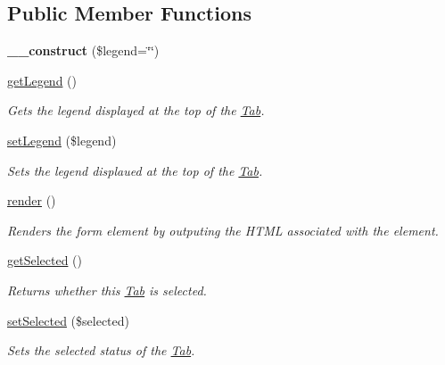 \subsection*{Public Member Functions}
\begin{DoxyCompactItemize}
\item 
\hypertarget{class_tab_a041f3c073a42ad6d5bb9178039b18fb7}{
{\bfseries \_\-\_\-construct} (\$legend=\char`\"{}\char`\"{})}
\label{class_tab_a041f3c073a42ad6d5bb9178039b18fb7}

\item 
\hypertarget{class_tab_a177b514a74756b45c634e3e8af462b83}{
\hyperlink{class_tab_a177b514a74756b45c634e3e8af462b83}{getLegend} ()}
\label{class_tab_a177b514a74756b45c634e3e8af462b83}

\begin{DoxyCompactList}\small\item\em Gets the legend displayed at the top of the \hyperlink{class_tab}{Tab}. \item\end{DoxyCompactList}\item 
\hypertarget{class_tab_a8462c4aab0a7cfaabca6a10ae6d59f19}{
\hyperlink{class_tab_a8462c4aab0a7cfaabca6a10ae6d59f19}{setLegend} (\$legend)}
\label{class_tab_a8462c4aab0a7cfaabca6a10ae6d59f19}

\begin{DoxyCompactList}\small\item\em Sets the legend displaued at the top of the \hyperlink{class_tab}{Tab}. \item\end{DoxyCompactList}\item 
\hyperlink{class_tab_aa8f0276a1139c47330e0216c04730182}{render} ()
\begin{DoxyCompactList}\small\item\em Renders the form element by outputing the HTML associated with the element. \item\end{DoxyCompactList}\item 
\hypertarget{class_tab_a8bd195df77c0cb8a60a4c6423d6eca03}{
\hyperlink{class_tab_a8bd195df77c0cb8a60a4c6423d6eca03}{getSelected} ()}
\label{class_tab_a8bd195df77c0cb8a60a4c6423d6eca03}

\begin{DoxyCompactList}\small\item\em Returns whether this \hyperlink{class_tab}{Tab} is selected. \item\end{DoxyCompactList}\item 
\hypertarget{class_tab_af42cbc79b77c966b870f025027c7f19e}{
\hyperlink{class_tab_af42cbc79b77c966b870f025027c7f19e}{setSelected} (\$selected)}
\label{class_tab_af42cbc79b77c966b870f025027c7f19e}

\begin{DoxyCompactList}\small\item\em Sets the selected status of the \hyperlink{class_tab}{Tab}. \item\end{DoxyCompactList}\end{DoxyCompactItemize}
